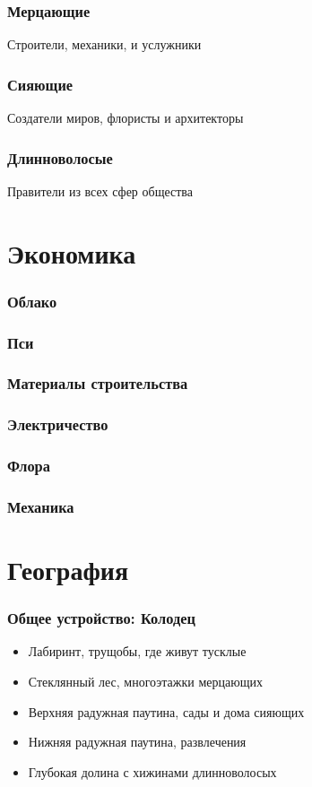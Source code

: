 \section{Мерцающие}
Строители, механики, и услужники
\section{Сияющие}
Создатели миров, флористы и архитекторы
\section{Длинноволосые}
Правители из всех сфер общества


\clearpage
\part{Экономика}
\section{Облако}
\section{Пси}
\section{Материалы строительства}
\section{Электричество}
\section{Флора}
\section{Механика}


\clearpage
\part{География}
\section{Общее устройство: Колодец}
\begin{itemize}
	\item Лабиринт, трущобы, где живут тусклые
	\item Стеклянный лес, многоэтажки мерцающих
	\item Верхняя радужная паутина, сады и дома сияющих
	\item Нижняя радужная паутина, развлечения
	\item Глубокая долина с хижинами длинноволосых
\end{itemize}
